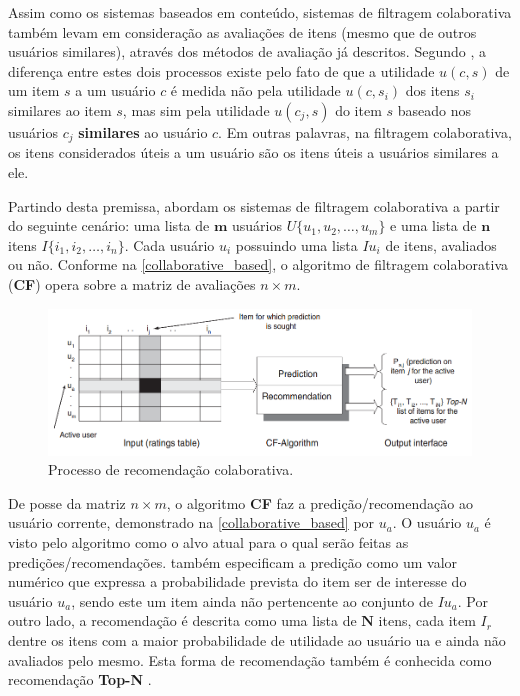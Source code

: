 \documentclass[12pt, openright, oneside, a4paper, brazil]{abntex2}
\begin{document}
Assim como os sistemas baseados em conteúdo, sistemas de filtragem colaborativa também levam em consideração as avaliações de itens (mesmo que de outros usuários similares), através dos métodos de avaliação já descritos. Segundo , a diferença entre estes dois processos existe pelo fato de que a utilidade $u(c,s)$ de um item $s$ a um usuário $c$ é medida não pela utilidade $u(c,s_{i})$ dos itens $s_{i}$ similares ao item $s$, mas sim pela utilidade $u(c_{j}, s)$ do item $s$ baseado nos usuários $c_{j}$ \textbf{similares} ao usuário $c$. Em outras palavras, na filtragem colaborativa, os itens considerados úteis a um usuário são os itens úteis a usuários similares a ele.

Partindo desta premissa,  abordam os sistemas de filtragem colaborativa a partir do seguinte cenário: uma lista de $\textbf{m}$ usuários $U \lbrace u_{1}, u_{2}, …, u_{m} \rbrace$ e uma lista de $\textbf{n}$ itens $I \lbrace i_{1}, i_{2}, …, i_{n} \rbrace$. Cada usuário $u_{i}$ possuindo uma lista $Iu_{i}$ de itens, avaliados ou não. Conforme na \autoref{collaborative_based}, o algoritmo de filtragem colaborativa (\textbf{CF}) opera sobre a matriz de avaliações $n \times m$.

\begin{figure}[htb]
	\caption{\label{collaborative_based}Processo de recomendação colaborativa.}

	\begin{center}
		\includegraphics[scale=0.6]{images/collaborative_based.png}
	\end{center}
\end{figure}

De posse da matriz $n \times m$, o algoritmo \textbf{CF} faz a predição/recomendação ao usuário corrente, demonstrado na \autoref{collaborative_based} por $u_{a}$. O usuário $u_{a}$ é visto pelo algoritmo como o alvo atual para o qual serão feitas as predições/recomendações.  também especificam a predição como um valor numérico que expressa a probabilidade prevista do item ser de interesse do usuário $u_{a}$, sendo este um item ainda não pertencente ao conjunto de $Iu_{a}$. Por outro lado, a recomendação é descrita como uma lista de $\textbf{N}$ itens, cada item $I_{r}$ dentre os itens com a maior probabilidade de utilidade ao usuário ua e ainda não avaliados pelo mesmo. Esta forma de recomendação também é conhecida como recomendação \textbf{Top-N} \cite{adomavicius2005toward}.
\end{document}

